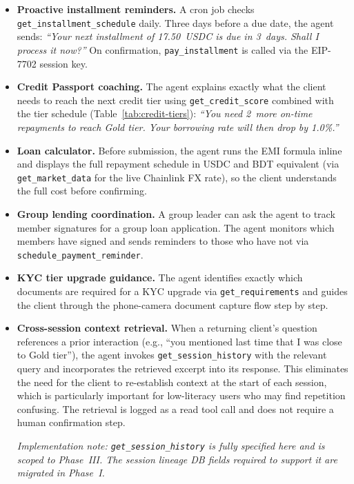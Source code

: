 \documentclass[12pt,a4paper]{report}
\begin{document}
\begin{itemize}[noitemsep]
\item \textbf{Proactive installment reminders.} A cron job checks \texttt{get\_installment\_schedule} daily. Three days before a due date, the agent sends: \emph{``Your next installment of 17.50~USDC is due in 3~days. Shall I process it now?''} On confirmation, \texttt{pay\_installment} is called via the EIP-7702 session key.
\item \textbf{Credit Passport coaching.} The agent explains exactly what the client needs to reach the next credit tier using \texttt{get\_credit\_score} combined with the tier schedule (Table~\ref{tab:credit-tiers}): \emph{``You need 2~more on-time repayments to reach Gold tier. Your borrowing rate will then drop by 1.0\%.''}
\item \textbf{Loan calculator.} Before submission, the agent runs the EMI formula inline and displays the full repayment schedule in USDC and BDT equivalent (via \texttt{get\_market\_data} for the live Chainlink FX rate), so the client understands the full cost before confirming.
\item \textbf{Group lending coordination.} A group leader can ask the agent to track member signatures for a group loan application. The agent monitors which members have signed and sends reminders to those who have not via \texttt{schedule\_payment\_reminder}.
\item \textbf{KYC tier upgrade guidance.} The agent identifies exactly which documents are required for a KYC upgrade via \texttt{get\_requirements} and guides the client through the phone-camera document capture flow step by step.

\item \textbf{Cross-session context retrieval.} When a returning client's question
references a prior interaction (e.g., ``you mentioned last time that I was close to
Gold tier''), the agent invokes \texttt{get\_session\_history} with the relevant
query and incorporates the retrieved excerpt into its response. This eliminates the
need for the client to re-establish context at the start of each session, which is
particularly important for low-literacy users who may find repetition confusing.
The retrieval is logged as a read tool call and does not require a human
confirmation step.

\textit{Implementation note: \texttt{get\_session\_history} is fully specified here
and is scoped to Phase~III. The session lineage DB fields required to support it are
migrated in Phase~I.}
\end{itemize}
\end{document}

